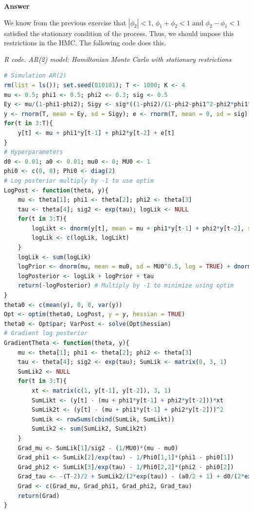 \begin{enumerate}[leftmargin=*]
\textbf{Answer}

We know from the previous exercise that $|\phi_2|<1$, $\phi_1+\phi_2<1$ and $\phi_2-\phi_1<1$ satisfied the stationary condition of the process. Thus, we should impose this restrictions in the HMC. The following code does this.

\begin{tcolorbox}[enhanced,width=4.67in,center upper,
	fontupper=\large\bfseries,drop shadow southwest,sharp corners]
	\textit{R code. AR(2) model:  Hamiltonian Monte Carlo with stationary restrictions}
	\begin{VF}
		\begin{lstlisting}[language=R]
# Simulation AR(2)
rm(list = ls()); set.seed(010101); T <- 1000; K <- 4 
mu <- 0.5; phi1 <- 0.5; phi2 <- 0.3; sig <- 0.5 
Ey <- mu/(1-phi1-phi2); Sigy <- sig*((1-phi2)/(1-phi2-phi1^2-phi2*phi1^2-phi2^2+phi2^3))^0.5 
y <- rnorm(T, mean = Ey, sd = Sigy); e <- rnorm(T, mean = 0, sd = sig)
for(t in 3:T){
	y[t] <- mu + phi1*y[t-1] + phi2*y[t-2] + e[t]
}
# Hyperparameters
d0 <- 0.01; a0 <- 0.01; mu0 <- 0; MU0 <- 1
phi0 <- c(0, 0); Phi0 <- diag(2)
# Log posterior multiply by -1 to use optim
LogPost <- function(theta, y){
	mu <- theta[1]; phi1 <- theta[2]; phi2 <- theta[3]
	tau <- theta[4]; sig2 <- exp(tau); logLik <- NULL
	for(t in 3:T){
		logLikt <- dnorm(y[t], mean = mu + phi1*y[t-1] + phi2*y[t-2], sd = sig2^0.5, log = TRUE)
		logLik <- c(logLik, logLikt)
	}
	logLik <- sum(logLik)
	logPrior <- dnorm(mu, mean = mu0, sd = MU0^0.5, log = TRUE) + dnorm(phi1, mean = phi0[1], sd = Phi0[1,1]^0.5, log = TRUE) + dnorm(phi2, mean = phi0[2], sd = Phi0[2,2]^0.5, log = TRUE) + invgamma::dinvgamma(sig2, shape = a0/2, rate = d0/2, log = TRUE)
	logPosterior <- logLik + logPrior + tau
	return(-logPosterior) # Multiply by -1 to minimize using optim
}
theta0 <- c(mean(y), 0, 0, var(y))
Opt <- optim(theta0, LogPost, y = y, hessian = TRUE)
theta0 <- Opt$par; VarPost <- solve(Opt$hessian)
# Gradient log posterior
GradientTheta <- function(theta, y){
	mu <- theta[1]; phi1 <- theta[2]; phi2 <- theta[3]
	tau <- theta[4]; sig2 <- exp(tau); SumLik <- matrix(0, 3, 1)
	SumLik2 <- NULL
	for(t in 3:T){
		xt <- matrix(c(1, y[t-1], y[t-2]), 3, 1)
		SumLikt <- (y[t] - (mu + phi1*y[t-1] + phi2*y[t-2]))*xt
		SumLik2t <- (y[t] - (mu + phi1*y[t-1] + phi2*y[t-2]))^2
		SumLik <- rowSums(cbind(SumLik, SumLikt))
		SumLik2 <- sum(SumLik2, SumLik2t)
	}
	Grad_mu <- SumLik[1]/sig2 - (1/MU0)*(mu - mu0)
	Grad_phi1 <- SumLik[2]/exp(tau) - 1/Phi0[1,1]*(phi1 - phi0[1])
	Grad_phi2 <- SumLik[3]/exp(tau) - 1/Phi0[2,2]*(phi2 - phi0[2])
	Grad_tau <- -(T-2)/2 + SumLik2/(2*exp(tau)) - (a0/2 + 1) + d0/(2*exp(tau)) + 1 
	Grad <- c(Grad_mu, Grad_phi1, Grad_phi2, Grad_tau)
	return(Grad)
}
\end{lstlisting}
	\end{VF}
\end{tcolorbox} 


\end{enumerate}
